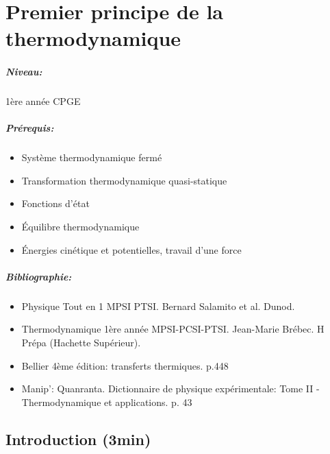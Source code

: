 \documentclass[11pt]{report}
\numberwithin{figure}{section}
\numberwithin{equation}{section}
\numberwithin{table}{section}
\newcommand{\1}{\boldsymbol{1}}
\begin{document}
\newpage





\chapter{Premier principe de la thermodynamique}


\paragraph*{Niveau:} 1ère année CPGE
\paragraph*{Prérequis:} 
\begin{itemize}
\item Système thermodynamique fermé \item Transformation thermodynamique quasi-statique
\item Fonctions d'état
\item Équilibre thermodynamique
\item Énergies cinétique et potentielles, travail d'une force 
\end{itemize}

\paragraph*{Bibliographie:}
\begin{itemize}
\item Physique Tout en 1 MPSI PTSI. Bernard Salamito et al. Dunod.
\item Thermodynamique 1ère année MPSI-PCSI-PTSI. Jean-Marie Brébec. H Prépa (Hachette Supérieur).
\item Bellier 4ème édition: transferts thermiques. p.448  
\item Manip': Quanranta. Dictionnaire de physique expérimentale: Tome II - Thermodynamique et applications. p. 43
\end{itemize}

  \section*{Introduction (3min)}
\end{document}

